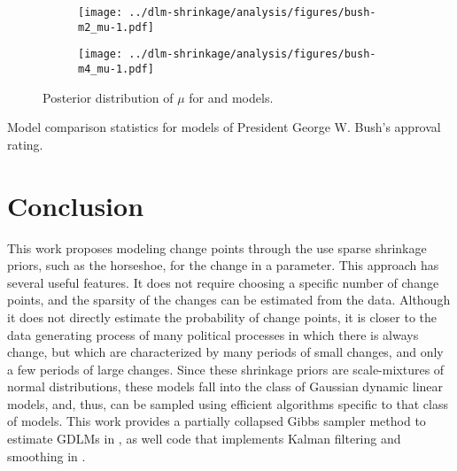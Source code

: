 \begin{figure}[thbp!]
  \begin{subfigure}[b]{\linewidth}
    \texttt{[image: ../dlm-shrinkage/analysis/figures/bush-m2\_mu-1.pdf]}
    \caption{}
  \end{subfigure}

  \begin{subfigure}[b]{\linewidth}
    \texttt{[image: ../dlm-shrinkage/analysis/figures/bush-m4\_mu-1.pdf]}
    \caption{}
  \end{subfigure}
  \caption{Posterior distribution of $\mu$ for  and  models.}
  \label{dlm:fig:bush_mu2}
\end{figure}


\begin{table}[thbp!]
  \centering
  
  \caption{Model comparison statistics for models of President George W. Bush's approval rating.}
  \label{dlm:tab:bush_model_comp}
\end{table}



\section{Conclusion}
\label{dlm:sec:conclusion}


This work proposes modeling change points through the use sparse shrinkage priors, such as the horseshoe, for the change in a parameter.
This approach has several useful features. 
It does not require choosing a specific number of change points, and the sparsity of the changes can be estimated from the data.
Although it does not directly estimate the probability of change points, it is closer to the data generating process of many political processes in which there is always change, but which are characterized by many periods of small changes, and only a few periods of large changes.
Since these shrinkage priors are scale-mixtures of normal distributions, these models fall into the class of Gaussian dynamic linear models, and, thus, can be sampled using efficient algorithms specific to that class of models.
This work provides a partially collapsed Gibbs sampler method to estimate GDLMs in \Stan{}, as well \Stan{} code that implements Kalman filtering and smoothing in \Stan{}.

